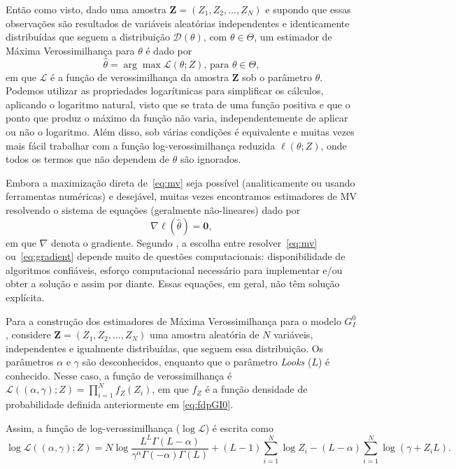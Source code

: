 Então como visto, dado uma amostra $\bm Z = (Z_1, Z_2, \dots, Z_N)$ e supondo que essas observações são resultados de variáveis aleatórias independentes e identicamente distribuídas que seguem a distribuição $\mathcal D(\theta)$, com $\theta \in \Theta$, um estimador de Máxima Verossimilhança para $\theta$ é dado por
\begin{equation}
    \widehat{\theta} = \arg\max \mathcal L(\theta; Z) \text{, para } \theta \in \Theta, \label{eq:mv}
\end{equation}
em que $\mathcal L$ é a função de verossimilhança da amostra $\bm Z$ sob o parâmetro $\theta$. Podemos utilizar as propriedades logarítmicas para simplificar os cálculos, aplicando o logaritmo natural, visto que se trata de uma função positiva e que o ponto que produz o máximo da função não varia, independentemente de aplicar ou não o logaritmo. 
Além disso, sob várias condições é equivalente e muitas vezes mais fácil trabalhar com a função log-verossimilhança reduzida $ \ell (\theta; Z)$, onde todos os termos que não dependem de $\theta$ são ignorados.

Embora a maximização direta de~\eqref{eq:mv} seja possível (analiticamente ou usando ferramentas numéricas) e desejável, muitas vezes encontramos estimadores de MV resolvendo o sistema de equações (geralmente não-lineares) dado por
\begin{equation}
    \nabla \ell (\widehat{\theta}) = \bm 0, \label{eq:gradient} 
\end{equation}
em que $\nabla$ denota o gradiente. 
Segundo \citet{FreryMinute2004}, a escolha entre resolver~\eqref{eq:mv} ou~\eqref{eq:gradient} depende muito de questões computacionais: disponibilidade de algoritmos confiáveis, esforço computacional necessário para implementar e/ou obter a solução e assim por diante. 
Essas equações, em geral, não têm solução explícita.

Para a construção dos estimadores de Máxima Verossimilhança para o modelo $G_I^0$, considere $\bm Z = (Z_1, Z_2, \dots, Z_N)$ uma amostra aleatória de $N$ variáveis, independentes e igualmente distribuídas, que seguem essa distribuição. 
Os parâmetros $\alpha$ e $\gamma$ são desconhecidos, enquanto que o parâmetro \textit{Looks} ($L$) é conhecido. 
Nesse caso, a função de verossimilhança é $\mathcal L((\alpha, \gamma); Z) = \prod_{i=1}^{N} f_Z(Z_i)$, em que $f_Z$ é a função densidade de probabilidade definida anteriormente em \eqref{eq:fdpGI0}. 

Assim, a função de log-verossimilhança ($\log \mathcal L$) é escrita como
\begin{equation}
    \log \mathcal L((\alpha, \gamma); Z) = N\log \frac{L^{L}\Gamma(L-\alpha)}{\gamma^{\alpha}\Gamma(-\alpha)\Gamma(L)} +  (L-1)\sum_{i=1}^{N}\log Z_i - (L-\alpha)\sum_{i=1}^{N}\log (\gamma + Z_iL). \label{eq:logVer}
\end{equation}

